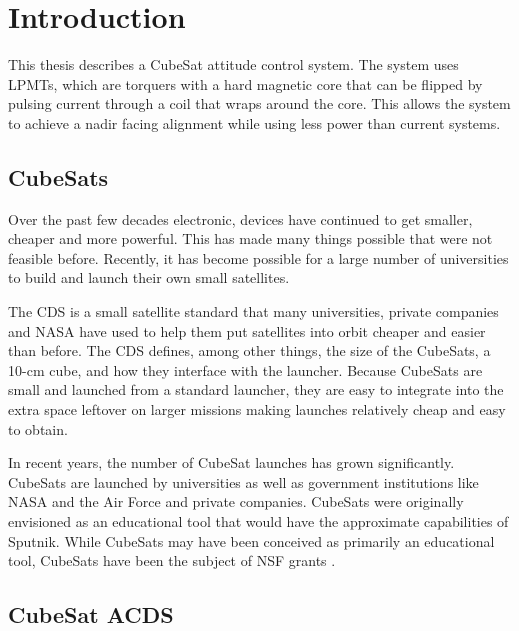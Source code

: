 

\chapter{Introduction}

This thesis describes a CubeSat attitude control system. The system uses \acfp{LPMT}, which are torquers with a hard magnetic core that can be flipped by pulsing current through a coil that wraps around the core. This allows the system to achieve a nadir facing alignment while using less power than current systems. 

\section{CubeSats}

Over the past few decades electronic, devices have continued to get smaller, cheaper and more powerful. This has made many things possible that were not feasible before. Recently, it has become possible for a large number of universities to build and launch their own small satellites.

The \acf{CDS}\cite{CDS} is a small satellite standard that many universities, private companies and NASA have used to help them put satellites into orbit cheaper and easier than before. The \ac{CDS} defines, among other things, the size of the CubeSats, a 10-cm cube, and how they interface with the launcher. Because CubeSats are small and launched from a standard launcher, they are easy to integrate into the extra space leftover on larger missions making launches relatively cheap and easy to obtain.

In recent years, the number of CubeSat launches has grown significantly. CubeSats are launched by universities as well as government institutions like NASA and the Air Force  and private companies. CubeSats were originally envisioned as an educational tool that would have the approximate capabilities of Sputnik. While CubeSats may have been conceived as primarily an educational tool,  CubeSats have been the subject of \ac{NSF} grants \cite{NSFcube}.

\section{CubeSat \acs*{ACDS}}

